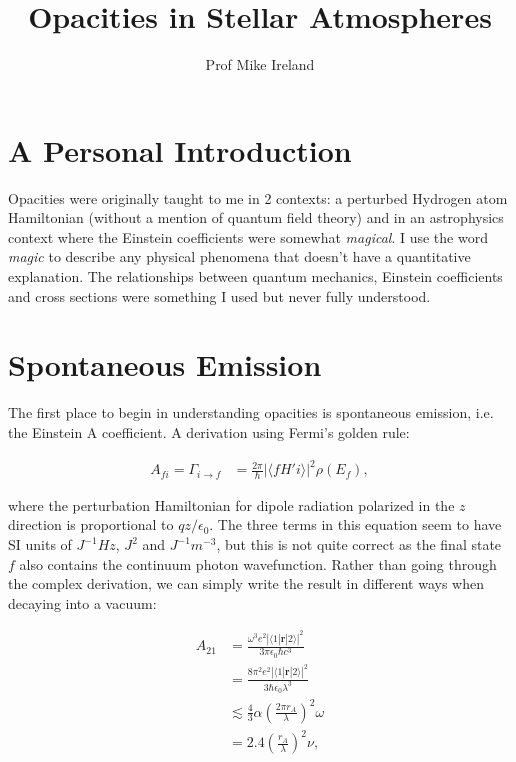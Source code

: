 \documentclass[12pt]{article}
\begin{document}
\title{Opacities in Stellar Atmospheres}
\author{Prof Mike Ireland}
\maketitle

\section{A Personal Introduction}

Opacities were originally taught to me in 2 contexts: a perturbed Hydrogen atom Hamiltonian (without a mention of quantum field theory) and in an astrophysics context where the Einstein coefficients were somewhat {\em magical}. I use the word {\em magic} to describe any physical phenomena that doesn't have a quantitative explanation. The relationships between quantum mechanics, Einstein coefficients and cross sections were something I used but never fully understood.

\section{Spontaneous Emission}

The first place to begin in understanding opacities is spontaneous emission, i.e. the Einstein A coefficient. A derivation using Fermi's golden rule:

\begin{align}
A_{fi} = \Gamma_{i \rightarrow f} &= \frac{2\pi}{\hbar} | \langle f H' i\rangle |^2 \rho(E_f),
\end{align}

where the perturbation Hamiltonian for dipole radiation polarized in the $z$ direction is proportional to $q z/\epsilon_0$. The three terms in this equation seem to have SI units of $J^{-1} Hz$, $J^2$ and $J^{-1} m^{-3} $, but this is not quite correct as the final state $f$ also contains the continuum photon wavefunction. Rather than going through the complex derivation, we can simply write the result in different ways when decaying into a vacuum:

\begin{align}
A_{21} &= \frac{\omega^3 e^2 |\langle 1 | \mathbf{r} | 2 \rangle | ^2}{3\pi \epsilon_0 \hbar c^3}\\
&= \frac{8 \pi^2 e^2 |\langle 1 | \mathbf{r} | 2 \rangle | ^2}{3 \hbar \epsilon_0 \lambda^3} \\
&\lesssim \frac{4}{3} \alpha \left( \frac{2\pi r_A}{\lambda} \right)^2 \omega \\
&= 2.4 \left( \frac{r_A}{\lambda} \right)^2 \nu,
\end{align}
\end{document}

